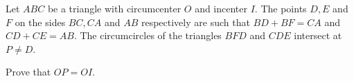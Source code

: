 Let 
$ABC$
 be a triangle with circumcenter 
$O$
 and incenter 
$I$.
 The points 
$D,E$
 and 
$F$
 on the sides 
$BC,CA$
 and 
$AB$
 respectively are such that 
$BD+BF=CA$
 and 
$CD+CE=AB$.
 The circumcircles of the triangles 
$BFD$
 and 
$CDE$
 intersect at 
$P \neq D$.

 Prove that 
$OP=OI$.
